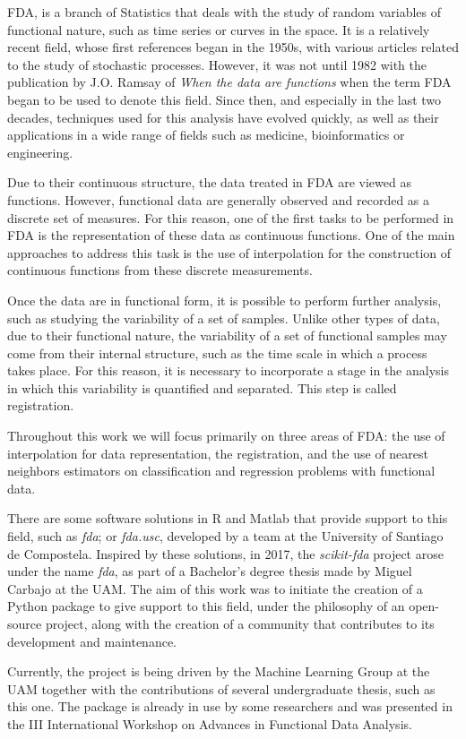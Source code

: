 
\ac{FDA}, is a branch of
Statistics that deals with the study of random variables of
functional nature, such as time series or curves in the
space. It is a relatively recent field, whose first references
began in the 1950s, with various articles related to the study of stochastic
processes. However, it was not until 1982 with the publication by
J.O. Ramsay of \textit{When the data are functions}\cite{Ramsay1982} when the
term \acs{FDA} began to be used to denote this field.
Since then, and especially in the last two decades, techniques used for this analysis
have evolved quickly, as well as their applications in a wide range of fields
such as medicine, bioinformatics or engineering.

Due to their continuous structure, the data treated in \acs{FDA} are viewed as functions.
However, functional data are generally observed and recorded as a discrete set of
measures. For this reason, one of the first tasks to be performed in \acs{FDA} is the
representation of these data as continuous functions.
One of the main approaches to address this task is the use of interpolation
for the construction of continuous functions from these discrete measurements.

Once the data are in functional form, it is possible to perform
further analysis, such as studying the variability of a set of samples.
Unlike other types of data, due to their functional nature, the variability of
a set of functional samples may come from their internal structure, such as the time scale
in which a process takes place. For this reason, it is necessary to
incorporate a stage in the analysis in which this variability is quantified
and separated. This step is called registration.

Throughout this work we will focus primarily on three areas of \acs{FDA}:
the use of interpolation for data representation, the registration, and the use
of nearest neighbors estimators on classification and regression problems with
functional data.

There are some software solutions in R and Matlab that provide support to this
field, such as \textit{fda}\cite{fda-r}\cite{Ramsay2009};
or \textit{fda.usc}\cite{FdaUsc}, developed by a team at the
University of Santiago de Compostela.
Inspired by these solutions, in 2017, the \textit{scikit-fda} project arose
under the name \textit{fda}\cite{FDA2018}, as part of a Bachelor's degree thesis
made by Miguel Carbajo at the UAM. The aim of this work was to initiate the creation of a
Python package to give support to this field, under the philosophy of an open-source
project, along with the creation of a community that contributes to its development
and maintenance.

Currently, the project is being driven by the Machine
Learning Group at the UAM together with the contributions of several
undergraduate thesis, such as this one.
The package is already in use by some researchers and was presented
in the III International Workshop on Advances in Functional Data
Analysis\cite{ramos-carrenoScikitfdaPythonPackage2019}.
